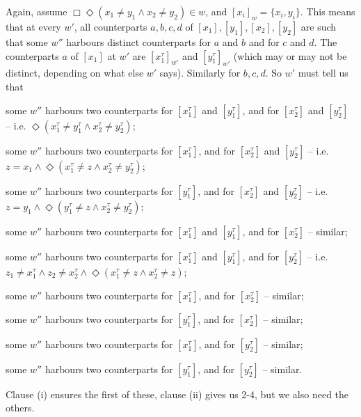 \documentclass[11pt]{woarticle}
\theoremstyle{break}
\theoremstyle{nonumberplain}
\newcommand{\1}{\;\,|\;\,}
\begin{document}
{  Again, assume $\Box \Diamond (x_1\!\not=\!y_1 \land x_2
  \!\not=\!y_2) \in w$, and $[x_i]_w= \{x_i,y_i\}$. This means that at
  every $w'$, all counterparts $a, b, c, d$ of
  $[x_1],[y_1],[x_2],[y_2]$ are such that some $w''$ harbours distinct
  counterparts for $a$ and $b$ and for $c$ and $d$. The counterparts
  $a$ of $[x_1]$ at $w'$ are $[x_1^\tau]_{w'}$ and $[y_1^\tau]_{w'}$
  (which may or may not be distinct, depending on what else $w'$
  says). Similarly for $b,c,d$. So $w'$ must tell us that
  \begin{compactenum}
    \item some $w''$ harbours two counterparts for $[x_1^\tau]$ and
      $[y_1^\tau]$, and for $[x_2^\tau]$ and $[y_2^\tau]$ --
      i.e. $\Diamond (x_1^\tau \!\not=\! y_1^\tau \land x_2^\tau
      \!\not=\!y_2^\tau)$;
    \item some $w''$ harbours two counterparts for $[x_1^\tau]$, and
      for $[x_2^\tau]$ and $[y_2^\tau]$ -- i.e. $z\!=\!x_1 \land
      \Diamond (x_1^\tau \!\not=\! z \land x_2^\tau
      \!\not=\!y_2^\tau)$;
    \item some $w''$ harbours two counterparts for $[y_1^\tau]$, and
      for $[x_2^\tau]$ and $[y_2^\tau]$ -- i.e. $z\!=\!y_1 \land
      \Diamond (y_1^\tau \!\not=\! z \land x_2^\tau
      \!\not=\!y_2^\tau)$;
    \item some $w''$ harbours two counterparts for $[x_1^\tau]$ and
      $[y_1^\tau]$, and for $[x_2^\tau]$ -- similar;
    \item some $w''$ harbours two counterparts for $[x_1^\tau]$ and
      $[y_1^\tau]$, and for $[y_2^\tau]$ -- i.e. $z_1\!\not=x_1^\tau
      \land z_2\!\not=\!x_2^\tau \land \Diamond (x_1^\tau \!\not=\!  z
      \land x_2^\tau \!\not=\!z)$;
    \item some $w''$ harbours two counterparts for $[x_1^\tau]$, and
      for $[x_2^\tau]$ -- similar;
    \item some $w''$ harbours two counterparts for $[y_1^\tau]$, and
      for $[x_2^\tau]$ -- similar;
    \item some $w''$ harbours two counterparts for $[x_1^\tau]$, and
      for $[y_2^\tau]$ -- similar;
    \item some $w''$ harbours two counterparts for $[y_1^\tau]$, and
      for $[y_2^\tau]$ -- similar.
  \end{compactenum}
  Clause (i) ensures the first of these, clause (ii) gives us 2-4, but
  we also need the others. 

}
\end{document}
